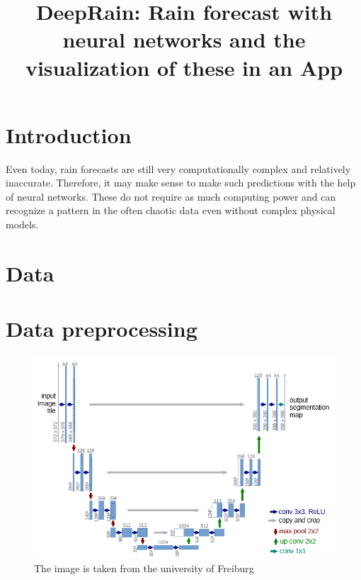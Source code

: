 \documentclass[oneside]{htwg-report}
\begin{document}



\newcommand{\verfasserA}{Simon Christofzik}
\newcommand{\verfasserB}{Paul Sutter}
\newcommand{\verfasserC}{Till Reitlinger}
\newcommand{\thema}{DeepRain: Rain forecast with neural networks and the visualization of these in an App}
\newcommand{\hoschschule}{HTWG Konstanz - University of Applied Sciences}
\newcommand{\institut}{HTWG Konstanz - Institute for Optical Systems}
\newcommand{\prueferA}{Prof. Dr. Oliver Dürr}


\title[Teamprojektthema]{\thema}


\makecover[]


\twocolumn
\section*{Introduction}

\begin{sloppypar}
Even today, rain forecasts are still very computationally complex and relatively inaccurate. 
Therefore, it may make sense to make such predictions with the help of neural networks. 
These do not require as much computing power and can recognize a pattern in the often chaotic data even without complex physical models.
\end{sloppypar}

\section*{Data}

\section*{Data preprocessing}

\begin{figure}[ht]
\centering
\includegraphics[width=0.8\linewidth]{../pics/UNet_Biomedical}
\caption{The image is taken from the university of Freiburg~\cite{ronneberger2015u}}
\end{figure}
\end{document}
